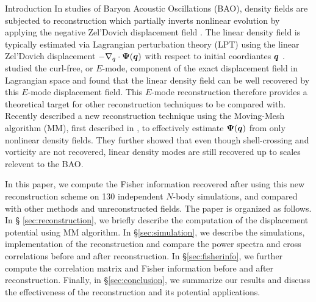 \begin{section}{Introduction}
  In studies of Baryon Acoustic Oscillations (BAO), density fields are
  subjected to reconstruction which partially inverts nonlinear
  evolution by applying the negative Zel'Dovich displacement field \cite{bib:Eisenstein2007}.
  The linear density field is
  typically estimated via Lagrangian perturbation theory (LPT)
  using the linear Zel'Dovich displacement $-\nabla_q\cdot\boldsymbol\Psi(\boldsymbol q)$
  with respect to initial coordiantes $\boldsymbol{q}$ \cite{bib:Zel1970}.
  \citet{bib:Yu2016} studied the curl-free, or $E$-mode, component of 
  the exact displacement field in Lagrangian
  space and found that the linear density field can be well recovered by
  this $E$-mode displacement field.
  This $E$-mode reconstruction therefore provides a theoretical 
  target for other reconstruction techniques to be compared with.
  Recently \citet{bib:Zhu2016} described a new reconstruction 
  technique using the Moving-Mesh
  algorithm (MM), first described in \cite{bib:Pen1995,bib:Pen1998},
  to effectively estimate $\boldsymbol{\Psi}(\boldsymbol{q})$ from only nonlinear
  density fields.  They further showed that even though shell-crossing
  and vorticity are not recovered, linear density modes are still 
  recovered up to scales relevent to the BAO.

  In this paper, we compute the Fisher information recovered after
  using this new reconstruction scheme on 130 independent $N$-body
  simulations, and compared with other methods and unreconstructed
  fields.  The paper is organized as follows.  In \S
  \ref{sec:reconstruction}, we briefly
  describe the computation of the displacement potential using MM
  algorithm. In \S \ref{sec:simulation}, we describe  
  the simulations, implementation of the reconstruction and compare 
  the power spectra and cross correlations before and after reconstruction.  
  In \S \ref{sec:fisherinfo}, we further compute the correlation matrix 
  and Fisher information before and
  after reconstruction.  Finally, in \S \ref{sec:conclusion}, we summarize 
  our results and 
  discuss the effectiveness of the reconstruction and its potential
  applications.


\end{section}

